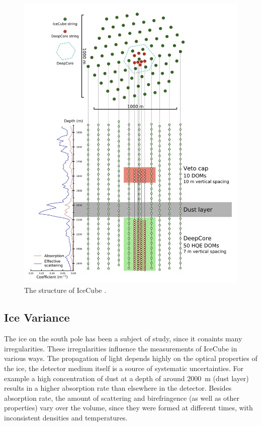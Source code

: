 \documentclass[a4paper,10pt]{scrartcl}
\begin{document}
\begin{figure}[h]
    \includegraphics[scale=0.6]{images/icecube.png}
    \centering
    \caption{The structure of IceCube \cite{left}.}
    \label{fig:icecube}
\end{figure}

\subsection{Ice Variance}

The ice on the south pole has been a subject of study, since it conaints many irregularities.
These irregularities influence the measurements of IceCube in various ways.
The propagation of light depends highly on the optical properties of the ice, the detector medium itself is a source of systematic uncertainties.
For example a high concentration of dust at a depth of around \SI{2000}{m} (dust layer) results in a higher absorption rate than elsewhere in the detector.
Besides absorption rate, the amount of scattering and birefringence (as well as other properties) vary over the volume, since they were formed at different times, with inconsistent densities and temperatures.
\end{document}
